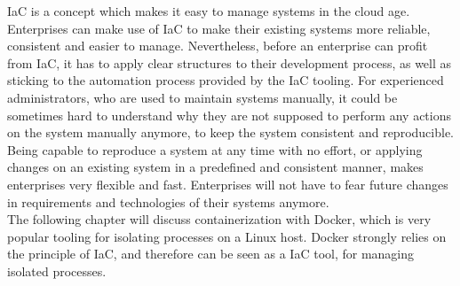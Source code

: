 IaC is a concept which makes it easy to manage systems in the cloud age. Enterprises can make use of IaC to make their existing systems more reliable, consistent and easier to manage. Nevertheless, before an enterprise can profit from IaC, it has to apply clear structures to their development process, as well as sticking to the automation process provided by the IaC tooling. For experienced administrators, who are used to maintain systems manually, it could be sometimes hard to understand why they are not supposed to perform any actions on the system manually anymore, to keep the system consistent and reproducible. Being capable to reproduce a system at any time with no effort, or applying changes on an existing system in a predefined and consistent manner, makes enterprises very flexible and fast. Enterprises will not have to fear future changes in requirements and technologies of their systems anymore. \\

The following chapter will discuss containerization with Docker, which is very popular tooling for isolating processes on a Linux host. Docker strongly relies on the principle of IaC, and therefore can be seen as a IaC tool, for managing isolated processes.    



